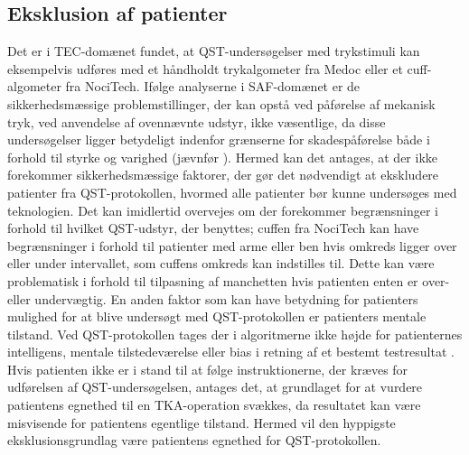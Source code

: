 \subsection{Eksklusion af patienter}
Det er i TEC-domænet fundet, at QST-undersøgelser med trykstimuli kan eksempelvis udføres med et håndholdt trykalgometer fra Medoc eller et cuff-algometer fra NociTech. 
Ifølge analyserne i SAF-domænet er de sikkerhedsmæssige problemstillinger, der kan opstå ved påførelse af mekanisk tryk, ved anvendelse af ovennævnte udstyr, ikke væsentlige, da disse undersøgelser ligger betydeligt indenfor grænserne for skadespåførelse både i forhold til styrke og varighed (jævnfør ). Hermed kan det antages, at der ikke forekommer sikkerhedsmæssige faktorer, der gør det nødvendigt at ekskludere patienter fra QST-protokollen, hvormed alle patienter bør kunne undersøges med teknologien. Det kan imidlertid overvejes om der forekommer begrænsninger i forhold til hvilket QST-udstyr, der benyttes; cuffen fra NociTech kan have begrænsninger i forhold til patienter med arme eller ben hvis omkreds ligger over eller under intervallet, som cuffens omkreds kan indstilles til. Dette kan være problematisk i forhold til tilpasning af manchetten hvis patienten enten er over- eller undervægtig. En anden faktor som kan have betydning for patienters mulighed for at blive undersøgt med QST-protokollen er patienters mentale tilstand. Ved QST-protokollen tages der i algoritmerne ikke højde for patienternes intelligens, mentale tilstedeværelse eller bias i retning af et bestemt testresultat \citep{Dyck1998}.  
Hvis patienten ikke er i stand til at følge instruktionerne, der kræves for udførelsen af QST-undersøgelsen, antages det, at grundlaget for at vurdere patientens egnethed til en TKA-operation svækkes, da resultatet kan være misvisende for patientens egentlige tilstand. Hermed vil den hyppigste eksklusionsgrundlag være patientens egnethed for QST-protokollen.

